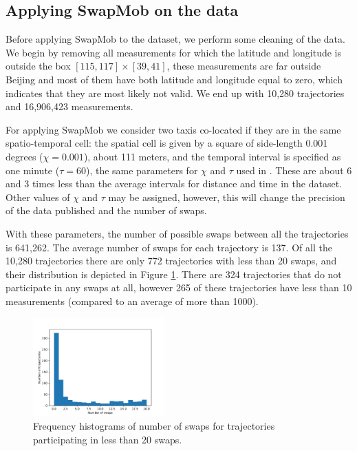 \documentclass[times,twocolumn,final,authoryear]{elsarticle}
\begin{document}
\subsection{Applying SwapMob on the data}
Before applying SwapMob to the dataset, we perform some cleaning of the
data. We begin by removing all measurements for which the latitude and
longitude is outside the box $[115, 117] \times [39, 41]$, these
measurements are far outside Beijing and most of them have both
latitude and longitude equal to zero, which indicates that they
are most likely not valid. We end up with 10,280 trajectories and 16,906,423
measurements.

For applying SwapMob we consider two taxis co-located if they are in
the same spatio-temporal cell: the spatial cell is given by a square of side-length 0.001 degrees ($\chi = 0.001$), about 111
meters, and the temporal interval is specified as one minute ($\tau = 60$), 
the same parameters for $\chi$ and $\tau$ used in \cite{Salas:2018-c}.
These are about 6 and 3 times less than the average intervals for distance and time in the dataset.
Other values of $\chi$ and $\tau$ may be assigned, however, this will change the precision of the data published and the number of swaps.

With these parameters, the number of possible swaps between all the
trajectories is 641,262. The average number of swaps for each
trajectory is 137. Of all the 10,280 trajectories there are only 772 trajectories with less than 20 swaps, and their distribution is depicted in Figure
\ref{fig:swaps-distribution}. There are 324 trajectories that do not
participate in any swaps at all, however 265 of these trajectories
have less than 10 measurements (compared to an average of more than
1000). 

\begin{figure}

    \includegraphics[width=0.45\textwidth]{figures/swaps-distribution-20.pdf}

  \caption{Frequency histograms of number of swaps for trajectories participating in less than 20 swaps.}
  \label{fig:swaps-distribution}%
\end{figure}
\end{document}
